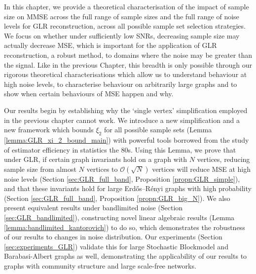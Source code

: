 In this chapter, we provide a theoretical characterisation of the impact of sample size on MMSE across the full range of sample sizes and the full range of noise levels for GLR reconstruction, across {all possible sample set selection strategies}. We focus on whether under sufficiently low SNRs, decreasing sample size may actually decrease MSE, which is important for the application of GLR reconstruction, a robust method, to domains where the noise may be greater than the signal. Like in the previous Chapter, this breadth is only possible through our rigorous theoretical characterisations which allow us to understand behaviour at high noise levels, to characterise behaviour on arbitrarily large graphs and to show when certain behaviours of MSE happen and why.

Our results begin by establishing why the `single vertex' simplification employed in the previous chapter cannot work. We introduce a new simplification and a new framework which bounds $\xi_{2}$ for all possible sample sets (Lemma \ref{lemma:GLR_xi_2_bound_main}) with powerful tools borrowed from the study of estimator efficiency in statistics the 80s. Using this Lemma, we prove that under GLR, if certain graph invariants hold on a graph with $N$ vertices, reducing sample size from almost $N$ vertices to $\mathcal{O}(\sqrt{N})$ vertices will reduce MSE at high noise levels (Section \ref{sec:GLR_full_band}, Proposition \ref{propn:GLR_simple}), and that these invariants hold for large Erdős–Rényi graphs with high probability {\color{black}(Section \ref{sec:GLR_full_band}, Proposition \ref{propn:GLR_big_N})}. We also present equivalent results under bandlimited noise (Section \ref{sec:GLR_bandlimited}), constructing novel linear algebraic results (Lemma \ref{lemma:bandlimited_kantorovich}) to do so, which demonstrates the robustness of our results to changes in noise distribution. Our experiments (Section \ref{sec:experiments_GLR}) validate this for large Stochastic Blockmodel and Barabasi-Albert graphs as well, demonstrating the applicability of our results to graphs with community structure and large scale-free networks.  %

